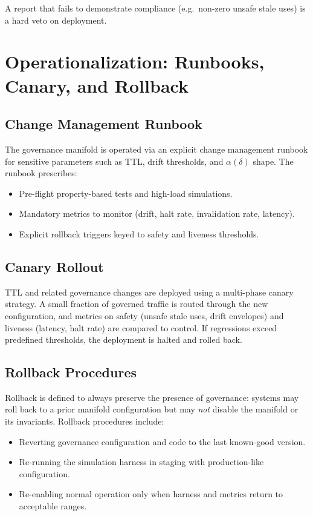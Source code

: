 \documentclass[11pt]{article}
\begin{document}
A report that fails to demonstrate compliance (e.g.\ non-zero unsafe stale uses) is a hard veto on deployment.

\section{Operationalization: Runbooks, Canary, and Rollback}

\subsection{Change Management Runbook}

The governance manifold is operated via an explicit change management runbook for sensitive parameters such as TTL, drift thresholds, and $\alpha(\delta)$ shape.
The runbook prescribes:
\begin{itemize}[noitemsep]
  \item Pre-flight property-based tests and high-load simulations.
  \item Mandatory metrics to monitor (drift, halt rate, invalidation rate, latency).
  \item Explicit rollback triggers keyed to safety and liveness thresholds.
\end{itemize}

\subsection{Canary Rollout}

TTL and related governance changes are deployed using a multi-phase canary strategy.
A small fraction of governed traffic is routed through the new configuration, and metrics on safety (unsafe stale uses, drift envelopes) and liveness (latency, halt rate) are compared to control.
If regressions exceed predefined thresholds, the deployment is halted and rolled back.

\subsection{Rollback Procedures}

Rollback is defined to always preserve the presence of governance:
systems may roll back to a prior manifold configuration but may \emph{not} disable the manifold or its invariants.
Rollback procedures include:
\begin{itemize}[noitemsep]
  \item Reverting governance configuration and code to the last known-good version.
  \item Re-running the simulation harness in staging with production-like configuration.
  \item Re-enabling normal operation only when harness and metrics return to acceptable ranges.
\end{itemize}
\end{document}
